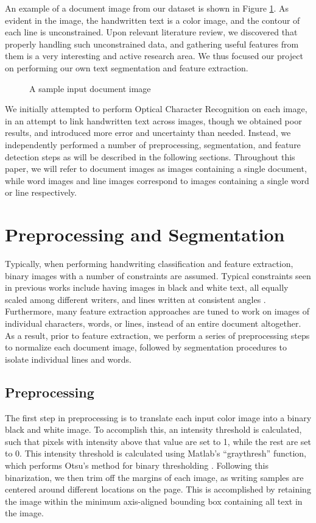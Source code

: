 \documentclass[paper=a4, fontsize=11pt]{scrartcl} %
\numberwithin{equation}{section} %
\numberwithin{figure}{section} %
\numberwithin{table}{section} %
\begin{document}
An example of a document image from our dataset is shown in Figure
\ref{fig:docImage}. As evident in the image, the handwritten text is a
color image, and the contour of each line is unconstrained. Upon
relevant literature review, we discovered that properly handling such
unconstrained data, and gathering useful features from them is a very
interesting and active research area. We thus focused our project on
performing our own text segmentation and feature extraction.


\begin{figure}
  \centering {}
  \caption{A sample input document image}
  \label{fig:docImage}
\end{figure}

We initially attempted to perform Optical Character Recognition on
each image, in an attempt to link handwritten text across images,
though we obtained poor results, and introduced more error and
uncertainty than needed. Instead, we independently performed a number
of preprocessing, segmentation, and feature detection steps as will be
described in the following sections. Throughout this paper, we will
refer to document images as images containing a single document, while
word images and line images correspond to images containing a single
word or line respectively.

\section{Preprocessing and Segmentation}
\label{sec:pands}
Typically, when performing handwriting classification and feature
extraction, binary images with a number of constraints are
assumed. Typical constraints seen in previous works include having
images in black and white text, all equally scaled among different
writers, and lines written at consistent angles
\cite{Preprocessing}. Furthermore, many feature extraction approaches
are tuned to work on images of individual characters, words, or lines,
instead of an entire document altogether. As a result, prior to
feature extraction, we perform a series of preprocessing steps to
normalize each document image, followed by segmentation procedures to
isolate individual lines and words.

\subsection{Preprocessing}
The first step in preprocessing is to translate each input color image
into a binary black and white image. To accomplish this, an intensity
threshold is calculated, such that pixels with intensity above that
value are set to 1, while the rest are set to 0. This intensity
threshold is calculated using Matlab's ``graythresh'' function, which
performs Otsu's method for binary thresholding
\cite{ThresholdSelection}. Following this binarization, we then trim
off the margins of each image, as writing samples are centered around
different locations on the page. This is accomplished by retaining the
image within the minimum axis-aligned bounding box containing all text
in the image.
\end{document}
